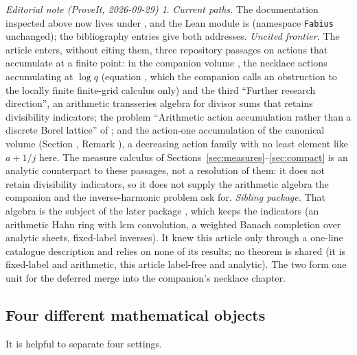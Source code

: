 \documentclass[11pt,a4paper]{article}
\theoremstyle{definition}
\theoremstyle{remark}
\newtheorem*{ednote}{Editorial note (ProveIt, 2026-09-29)}
\numberwithin{equation}{section}
\begin{document}
\begin{ednote}\label{ed:repo-context}
\emph{Current paths.} The documentation inspected above now lives under , and the Lean module is  (namespace \texttt{Fabius} unchanged); the bibliography entries give both addresses.
\emph{Uncited frontier.} The article enters, without citing them, three repository passages on actions that accumulate at a finite point: in the companion volume , the necklace actions accumulating at $\log q$ (equation , which the companion calls an obstruction to the locally finite finite-grid calculus only) and the third ``Further research direction'', an arithmetic transseries algebra for divisor sums that retains divisibility indicators; the problem ``Arithmetic action accumulation rather than a discrete Borel lattice'' of ; and the action-one accumulation of the canonical volume (Section , Remark ), a decreasing action family with no least element like $a+1/j$ here. The measure calculus of Sections~\ref{sec:measures}--\ref{sec:compact} is an analytic counterpart to these passages, not a resolution of them: it does not retain divisibility indicators, so it does not supply the arithmetic algebra the companion and the inverse-harmonic problem ask for.
\emph{Sibling package.} That algebra is the subject of the later package , which keeps the indicators (an arithmetic Hahn ring with lcm convolution, a weighted Banach completion over analytic sheets, fixed-label inverses). It knew this article only through a one-line catalogue description and relies on none of its results; no theorem is shared (it is fixed-label and arithmetic, this article label-free and analytic). The two form one unit for the deferred merge into the companion's necklace chapter.
\end{ednote}

\subsection{Four different mathematical objects}
It is helpful to separate four settings.
\end{document}
